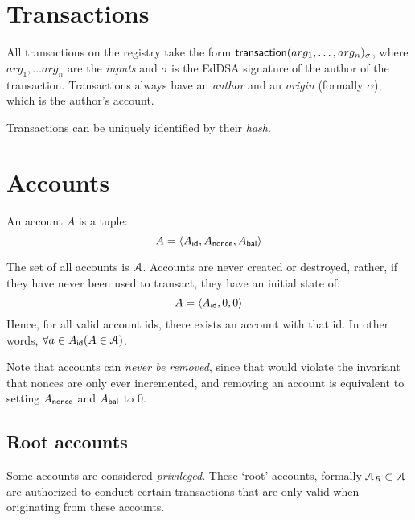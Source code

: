 \section{Transactions}
\label{s:transactions}

All transactions on the registry take the form $\operatorname{\mathsf{transaction}}\lparen arg_1, \ldots,
arg_n\rparen_\sigma$, where $arg_1, \ldots arg_n$ are the \emph{inputs} and $\sigma$ is the
\textsf{EdDSA} signature of the author of the transaction. Transactions always
have an \emph{author} and an \emph{origin} (formally $\alpha$), which is the
author's account.

Transactions can be uniquely identified by their \emph{hash}.

\section{Accounts}
An account $A$ is a tuple:
\[
    A = \langle A_{\mathsf{id}}, A_{\mathsf{nonce}}, A_{\mathsf{bal}}\rangle
\]

The set of all accounts is $\mathcal{A}$. Accounts are never created or destroyed,
rather, if they have never been used to transact, they have an initial state of:
\[
    A = \langle A_{\mathsf{id}}, 0, 0\rangle
\]
Hence, for all valid account ids, there exists an account with that id. In other
words, $\forall a \in A_{\mathsf{id}} (A \in \mathcal{A})$.

Note that accounts can \emph{never be removed}, since that would violate the
invariant that nonces are only ever incremented, and removing an account is
equivalent to setting $A_{\mathsf{nonce}}$ and $A_{\mathsf{bal}}$ to $0$.

\subsection{Root accounts}
Some accounts are considered \emph{privileged}. These `root' accounts,
formally $\mathcal{A}_R \subset \mathcal{A}$ are authorized to conduct certain transactions
that are only valid when originating from these accounts.

